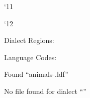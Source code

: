 
\catcode `\@11\relax

\catcode `\@12\relax


Dialect Regions:


Language Codes:


\ForEachTrackedDialect{\ThisDialect}
{%
  {Found ``animals-\CurrentTrackedTag.ldf''\par}%
  {No file found for dialect ``\ThisDialect''\par}
}

\bye
